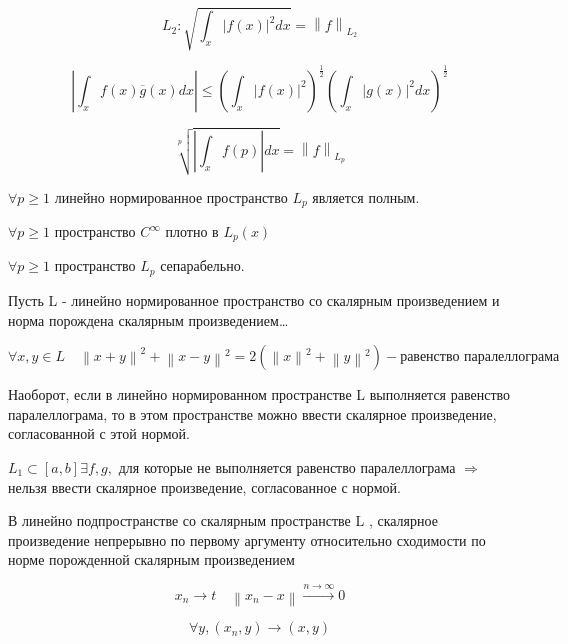 \documentclass[12pt, a4paper]{report}
\begin{document}
\[ L_2 : \sqrt{ \int  _x |f(x)| ^2 dx    } = \left\lVert f  \right\rVert _{L_2}  \] 

\[ \left\lvert \int  _{x }  f (x ) \overline{g }  (x ) dx        \right\rvert  \le  \left( \int_{x }|f(x ) | ^2 \right) ^{\frac{1}{2 } } \left( \int_{x } |g(x)| ^2 dx   \right) ^{\frac{1}{2} }  \] 

\[ \sqrt[  p ]{|\int_{x }f(p)|dx}= \left\lVert f  \right\rVert _{L_p} \]  

\begin{lemma}
    \( \forall p \geq 1   \) линейно нормированное пространство  \( L_ p   \)  является полным.  
\end{lemma}

\begin{lemma}
    \( \forall  p \geq 1   \)  пространство \( C^{\infty }  \) плотно в \( L_p (x) \)  
\end{lemma}

\begin{lemma}
    \( \forall  p \ge 1  \)  пространство \( L _ p  \)  сепарабельно.
\end{lemma}

\begin{lemma}
    Пусть L - линейно нормированное пространство со скалярным произведением и норма порождена скалярным произведением\dots

    \[ \forall  x, y \in  L \quad  \left\lVert x+ y  \right\rVert ^2 + \left\lVert  x- y  \right\rVert ^2 = 2 (\left\lVert x   \right\rVert ^2 + \left\lVert y  \right\rVert ^2) - \text{равенство паралеллограма} \] 
\end{lemma}

Наоборот, если в линейно нормированном пространстве L выполняется равенство паралеллограма, то в этом пространстве можно ввести скалярное произведение, согласованной с этой нормой.

\( L_1 \subset [ a, b ] \exists  f,g ,   \)  для которые не выполняется равенство паралеллограма \( \Rightarrow      \) нельзя ввести скалярное произведение, согласованное с нормой.

\begin{lemma}
    В линейно  подпространстве со скалярным пространстве  L , скалярное произведение непрерывно по первому аргументу относительно сходимости по норме порожденной скалярным произведением

    \[ x_n \to  t \quad \left\lVert x_n - x           \right\rVert  \xrightarrow{n \to  \infty }  0  \] 

    \[ \forall y , (x_n, y  ) \to  (x, y ) \] 
\end{lemma}
\end{document}
